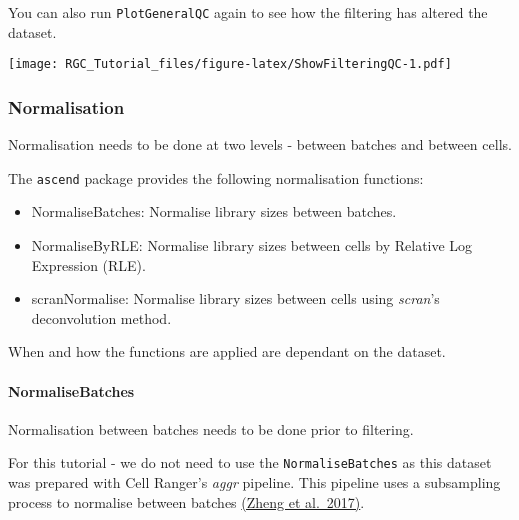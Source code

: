 \documentclass[]{article}
\newenvironment{Shaded}{\begin{snugshade}}{\end{snugshade}}
\newcommand{\DataTypeTok}[1]{\textcolor[rgb]{0.13,0.29,0.53}{#1}}
\newcommand{\DecValTok}[1]{\textcolor[rgb]{0.00,0.00,0.81}{#1}}
\newcommand{\KeywordTok}[1]{\textcolor[rgb]{0.13,0.29,0.53}{\textbf{#1}}}
\newcommand{\NormalTok}[1]{#1}
\newcommand{\OperatorTok}[1]{\textcolor[rgb]{0.81,0.36,0.00}{\textbf{#1}}}
\providecommand{\tightlist}{%
  \setlength{\itemsep}{0pt}\setlength{\parskip}{0pt}}
\let\oldparagraph\paragraph
\renewcommand{\paragraph}[1]{\oldparagraph{#1}\mbox{}}
\begin{document}
You can also run \texttt{PlotGeneralQC} again to see how the filtering
has altered the dataset.

\begin{Shaded}
\end{Shaded}

\texttt{[image: RGC\_Tutorial\_files/figure-latex/ShowFilteringQC-1.pdf]}

\hypertarget{normalisation}{%
\subsubsection{Normalisation}\label{normalisation}}

Normalisation needs to be done at two levels - between batches and
between cells.

The \texttt{ascend} package provides the following normalisation
functions:

\begin{itemize}
\tightlist
\item
  NormaliseBatches: Normalise library sizes between batches.
\item
  NormaliseByRLE: Normalise library sizes between cells by Relative Log
  Expression (RLE).
\item
  scranNormalise: Normalise library sizes between cells using
  \emph{scran}'s deconvolution method.
\end{itemize}

When and how the functions are applied are dependant on the dataset.

\hypertarget{normalisebatches}{%
\paragraph{NormaliseBatches}\label{normalisebatches}}

Normalisation between batches needs to be done prior to filtering.

For this tutorial - we do not need to use the \texttt{NormaliseBatches}
as this dataset was prepared with Cell Ranger's \emph{aggr} pipeline.
This pipeline uses a subsampling process to normalise between batches
\href{https://www.nature.com/articles/ncomms14049}{(Zheng et al.~2017)}.
\end{document}

